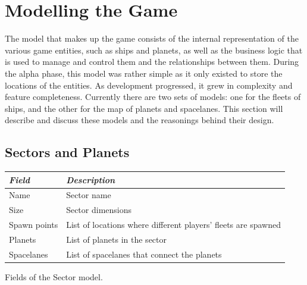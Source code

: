 \section{Modelling the Game}
\label{sec:model}

% 

The model that makes up the game consists of the internal representation of the various game entities, such as ships and planets, as well as the business logic that is used to manage and control them and the relationships between them. During the alpha phase, this model was rather simple as it only existed to store the locations of the entities. As development progressed, it grew in complexity and feature completeness. Currently there are two sets of models: one for the fleets of ships, and the other for the map of planets and spacelanes. This section will describe and discuss these models and the reasonings behind their design.

\subsection{Sectors and Planets}

\begin{margintable}
    \begin{tabular}{p{4em} p{11em}}
    \toprule
    \emph{Field} & \emph{Description} \\
    \midrule

    Name & Sector name \\
    Size & Sector dimensions \\
    Spawn points & List of locations where different players' fleets are spawned \\
    Planets & List of planets in the sector \\
    Spacelanes & List of spacelanes that connect the planets \\

    \bottomrule
    \end{tabular}
    \vspace{1em}
    \caption[Fields of the Sector model]{Fields of the Sector model.}
    \label{tab:sector-fields}
\end{margintable}

